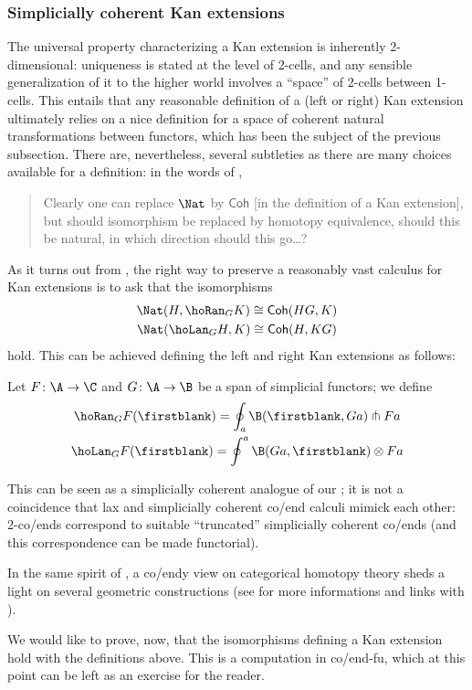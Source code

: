 \subsubsection{\bf Simplicially coherent Kan extensions}
The universal property characterizing a Kan extension is inherently 2-dimensional: uniqueness is stated at the level of 2-cells, and any sensible generalization of it to the higher world involves a ``space'' of 2-cells between 1-cells. This entails that any reasonable definition of a (left or right) Kan extension ultimately relies on a nice definition for a space of coherent natural transformations between functors, which has been the subject of the previous subsection. There are, nevertheless, several subtleties as there are many choices available for a definition: in the words of \cite{cordier1997homotopy},
\begin{quote}
Clearly one can replace $\Nat$ by $\textsf{Coh}$ [in the definition of a Kan extension], but should isomorphism be replaced by homotopy equivalence, should this be natural, in which direction should this go\dots ?
\end{quote}
As it turns out from \cite{cordier1997homotopy}, the right way to preserve a reasonably vast calculus for Kan extensions is to ask that the isomorphisms
\begin{gather*}
\Nat(H,\hoRan_G K)\cong \textsf{Coh}(HG,K)\\
\Nat(\hoLan_G H,K)\cong \textsf{Coh}(H,KG)
\end{gather*}
hold. This can be achieved defining the left and right Kan extensions as follows:
\begin{definition}\label{cohkan}
Let $F \colon\A \to \C$ and $G\colon \A \to \B$ be a span of simplicial functors; we define
\begin{gather*}
\hoRan_G F(\firstblank) = \oint_a \B(\firstblank,Ga)\pitchfork Fa\\
\hoLan_G F (\firstblank) = \oint^a \B(Ga,\firstblank)\otimes Fa
\end{gather*}
\end{definition}
\begin{remark}
This can be seen as a simplicially coherent analogue of our ; it is not a coincidence that lax and simplicially coherent co/end calculi mimick each other: 2-co/ends correspond to suitable ``truncated'' simplicially coherent co/ends (and this correspondence can be made functorial). 

In the same spirit of \cite{bozapalides1980some}, a co/endy view on categorical homotopy theory sheds a light on several geometric constructions (see \cite{cordier1997homotopy} for more informations and links with \cite{MR1080880,segal1974a}).
\end{remark}
We would like to prove, now, that the isomorphisms defining a Kan extension hold with the definitions above. This is a computation in co/end-fu, which at this point can be left as an exercise for the reader.
